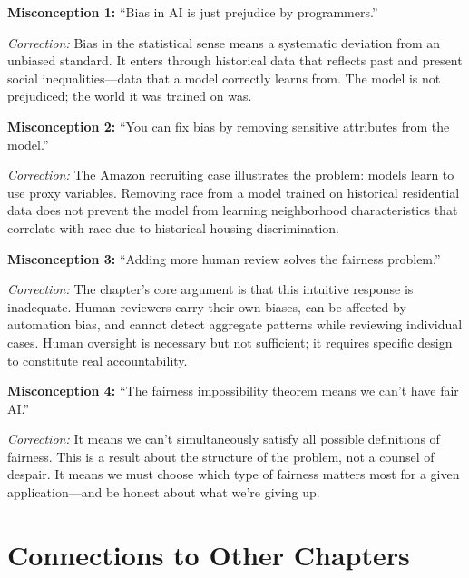\textbf{Misconception 1:} ``Bias in AI is just prejudice by programmers.''

\textit{Correction:} Bias in the statistical sense means a systematic deviation from an unbiased standard. It enters through historical data that reflects past and present social inequalities---data that a model correctly learns from. The model is not prejudiced; the world it was trained on was.

\textbf{Misconception 2:} ``You can fix bias by removing sensitive attributes from the model.''

\textit{Correction:} The Amazon recruiting case illustrates the problem: models learn to use proxy variables. Removing race from a model trained on historical residential data does not prevent the model from learning neighborhood characteristics that correlate with race due to historical housing discrimination.

\textbf{Misconception 3:} ``Adding more human review solves the fairness problem.''

\textit{Correction:} The chapter's core argument is that this intuitive response is inadequate. Human reviewers carry their own biases, can be affected by automation bias, and cannot detect aggregate patterns while reviewing individual cases. Human oversight is necessary but not sufficient; it requires specific design to constitute real accountability.

\textbf{Misconception 4:} ``The fairness impossibility theorem means we can't have fair AI.''

\textit{Correction:} It means we can't simultaneously satisfy all possible definitions of fairness. This is a result about the structure of the problem, not a counsel of despair. It means we must choose which type of fairness matters most for a given application---and be honest about what we're giving up.

\section*{Connections to Other Chapters}

